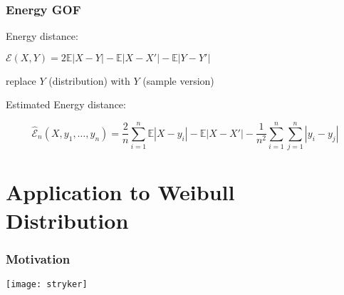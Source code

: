 \documentclass[presentation]{beamer}
\newenvironment{Figure}
{\par\medskip\noindent\minipage{\linewidth}}
{\endminipage\par\medskip}
\begin{document}

\begin{frame}
  \frametitle{Energy GOF}
  \begin{block}{Energy distance:}
    \begin{center}
      $\mathcal{E}(X,Y) = 2\mathbb{E}|X - Y| - \mathbb{E}|X - X'| -
      \mathbb{E}|Y - Y'|$
    \end{center}
  \end{block}
  replace $Y$ (distribution) with $Y$ (sample version)
  \begin{block}{Estimated Energy distance:}
    \begin{center}
      $$\hat{\mathcal{E}}_n(X, y_1, \ldots, y_n) = \frac{2}{n} \sum_{i=1}^n \mathbb{E}|X - y_i|  - \mathbb{E}|X - X'|  - \frac{1}{n^2} \sum_{i=1}^n \sum_{j=1}^n |y_i - y_j|$$
    \end{center}
  \end{block}  
\end{frame}

\section{Application to Weibull Distribution}

\begin{frame}
  \frametitle{Motivation}
  \begin{Figure}
    \centering
    \texttt{[image: stryker]}
  \end{Figure}
\end{frame}
\end{document}
